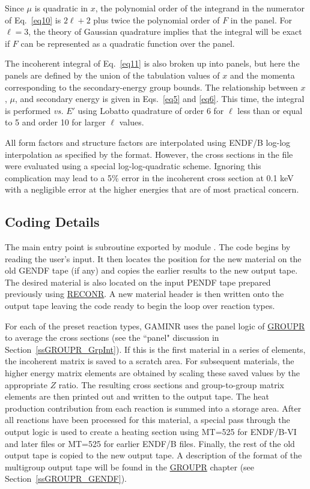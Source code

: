 Since $\mu$ is quadratic in $x$, the polynomial order of the integrand
in the numerator of Eq.~\ref{eq10} is $2\ell+2$ plus twice the polynomial
order of $F$ in the panel.  For $\ell=3$, the theory of Gaussian quadrature
implies that the integral will be exact if $F$ can be represented as a
quadratic function over the panel.

The incoherent integral of Eq.~\ref{eq11} is also broken up into panels,
but here the panels are defined by the union of the tabulation values
of $x$ and the momenta corresponding to the secondary-energy group
bounds.  The relationship between $x$, $\mu$, and secondary energy is given
in Eqs.~\ref{eq5} and \ref{eq6}.  This time, the integral is
performed {\it vs.} $E'$ using Lobatto quadrature
of order 6 for $\ell$ less than or equal to 5 and order 10 for
larger $\ell$ values.

All form factors and structure factors are interpolated using
ENDF/B log-log interpolation as specified by the format.  However, the
cross sections in the file were evaluated using a special
log-log-quadratic scheme.  Ignoring this complication may lead to a 5\%
error in the incoherent cross section at 0.1 keV with a negligible
error at the higher energies that are of most practical
concern\cite{Hubbell}.

\subsection{Coding Details}
\label{ssGAMINR_details}

The main entry point is subroutine  exported by
module .
The code begins by reading the user's input.  It then locates the
position for the new material on the old GENDF
tape (if any) and copies the earlier results to the new output
tape.  The desired material is also located on the input
PENDF tape prepared previously using
\hyperlink{sRECONRhy}{RECONR}.
A new material header is then written onto the output tape leaving
the code ready to begin the loop over reaction types.

For each of the preset reaction types, GAMINR uses the panel logic
of \hyperlink{sGROUPRhy}{GROUPR} to
average the cross sections (see the ``panel" discussion
in Section~\ref{ssGROUPR_GrpInt}).  If this is the first material
in a series of elements, the incoherent matrix is saved to a scratch area.
For subsequent materials, the higher energy matrix elements are obtained
by scaling these saved values by the appropriate $Z$ ratio.  The
resulting cross sections and group-to-group matrix elements are then
printed out and written to the output tape.  The heat production
contribution from each reaction is summed into a storage area.  After
all reactions have been processed for this material, a special pass
through the output logic is used to create a heating section using
MT=525 for ENDF/B-VI and later files or MT=525 for earlier
ENDF/B files.  Finally, the rest of the
old output tape is copied to the new output tape.  A description of the
format of the multigroup output tape will be found in the
\hyperlink{sGROUPRhy}{GROUPR} chapter
(see Section~\ref{ssGROUPR_GENDF}).

